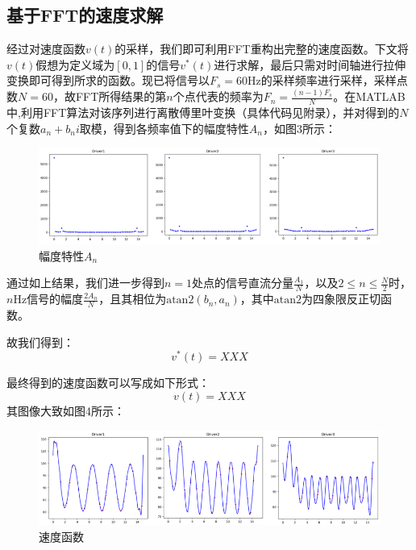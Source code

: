 \documentclass[bwprint]{cumcmthesis}
\begin{document}
        \subsection{基于FFT的速度求解}
        经过对速度函数$v(t)$的采样，我们即可利用FFT重构出完整的速度函数。下文将$v(t)$假想为定义域为$[0,1]$的信号$v^*(t)$进行求解，最后只需对时间轴进行拉伸变换即可得到所求的函数。现已将信号以$F_s=60\mathrm{Hz}$的采样频率进行采样，采样点数$N=60$，故FFT所得结果的第$n$个点代表的频率为$F_n=\frac{(n-1)F_s}{N}$。在MATLAB中,利用FFT算法对该序列进行离散傅里叶变换（具体代码见附录），并对得到的$N$个复数$a_n+b_ni$取模，得到各频率值下的幅度特性$A_n$，如图3所示：
        \begin{figure}[htbp]
            \centering
            \includegraphics[width=1\linewidth]{mod.png}
            \caption{幅度特性$A_n$}
        \end{figure}

        通过如上结果，我们进一步得到$n=1$处点的信号直流分量$\frac{A_1}{N}$，以及$2\leq n\leq \frac{N}{2}$时，$n\mathrm{Hz}$信号的幅度$\frac{2A_n}{N}$，且其相位为$\mathrm{atan2}(b_n,a_n)$，其中$\mathrm{atan2}$为四象限反正切函数。

        故我们得到： 
        \begin{equation*}
            v^*(t)=XXX
        \end{equation*}

        最终得到的速度函数可以写成如下形式：
        \begin{equation*}
            v(t)=XXX
        \end{equation*}
        其图像大致如图4所示：
        \begin{figure}[htbp]
            \centering

            \includegraphics[width=1\linewidth]{v.png}
            \caption{速度函数}
        \end{figure}
\end{document}
